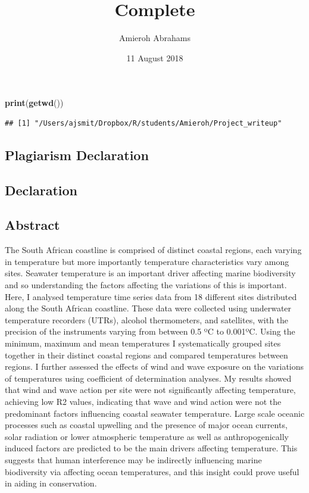 \documentclass[12pt,A4paper,]{article}
\title{Complete}
\author{Amieroh Abrahams}
\date{11 August 2018}
\newenvironment{Shaded}{\begin{snugshade}}{\end{snugshade}}
\newcommand{\KeywordTok}[1]{\textcolor[rgb]{0.13,0.29,0.53}{\textbf{#1}}}
\newcommand{\NormalTok}[1]{#1}
\begin{document}
\maketitle

{
\setcounter{tocdepth}{4}
\tableofcontents
}
\begin{Shaded}
\begin{Highlighting}[]
\KeywordTok{print}\NormalTok{(}\KeywordTok{getwd}\NormalTok{())}
\end{Highlighting}
\end{Shaded}

\begin{verbatim}
## [1] "/Users/ajsmit/Dropbox/R/students/Amieroh/Project_writeup"
\end{verbatim}

\newpage

\subsection{Plagiarism Declaration}\label{plagiarism-declaration}

\newpage

\subsection{Declaration}\label{declaration}

\newpage

\subsection{Abstract}\label{abstract}

The South African coastline is comprised of distinct coastal regions,
each varying in temperature but more importantly temperature
characteristics vary among sites. Seawater temperature is an important
driver affecting marine biodiversity and so understanding the factors
affecting the variations of this is important. Here, I analysed
temperature time series data from 18 different sites distributed along
the South African coastline. These data were collected using underwater
temperature recorders (UTRs), alcohol thermometers, and satellites, with
the precision of the instruments varying from between 0.5 ºC to 0.001ºC.
Using the minimum, maximum and mean temperatures I systematically
grouped sites together in their distinct coastal regions and compared
temperatures between regions. I further assessed the effects of wind and
wave exposure on the variations of temperatures using coefficient of
determination analyses. My results showed that wind and wave action per
site were not significantly affecting temperature, achieving low R2
values, indicating that wave and wind action were not the predominant
factors influencing coastal seawater temperature. Large scale oceanic
processes such as coastal upwelling and the presence of major ocean
currents, solar radiation or lower atmospheric temperature as well as
anthropogenically induced factors are predicted to be the main drivers
affecting temperature. This suggests that human interference may be
indirectly influencing marine biodiversity via affecting ocean
temperatures, and this insight could prove useful in aiding in
conservation.
\end{document}
